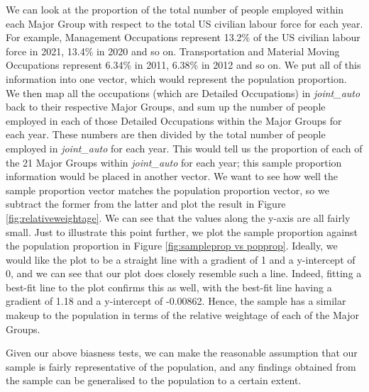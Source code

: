 \documentclass[11pt]{article}
\begin{document}
We can look at the proportion of the total number of people employed within each Major Group with respect to the total US civilian labour force for each year. For example, Management Occupations represent 13.2\% of the US civilian labour force in 2021, 13.4\% in 2020 and so on. Transportation and Material Moving Occupations represent 6.34\% in 2011, 6.38\% in 2012 and so on. We put all of this information into one vector, which would represent the population proportion. We then map all the occupations (which are Detailed Occupations) in \emph{joint\_auto} back to their respective Major Groups, and sum up the number of people employed in each of those Detailed Occupations within the Major Groups for each year. These numbers are then divided by the total number of people employed in \emph{joint\_auto} for each year. This would tell us the proportion of each of the 21 Major Groups within \emph{joint\_auto} for each year; this sample proportion information would be placed in another vector. We want to see how well the sample proportion vector matches the population proportion vector, so we subtract the former from the latter and plot the result in Figure \ref{fig:relativeweightage}. We can see that the values along the y-axis are all fairly small. Just to illustrate this point further, we plot the sample proportion against the population proportion in Figure \ref{fig:sampleprop vs popprop}. Ideally, we would like the plot to be a straight line with a gradient of 1 and a y-intercept of 0, and we can see that our plot does closely resemble such a line. Indeed, fitting a best-fit line to the plot confirms this as well, with the best-fit line having a gradient of 1.18 and a y-intercept of -0.00862. Hence, the sample has a similar makeup to the population in terms of the relative weightage of each of the Major Groups.

Given our above biasness tests, we can make the reasonable assumption that our sample is fairly representative of the population, and any findings obtained from the sample can be generalised to the population to a certain extent.
\end{document}
